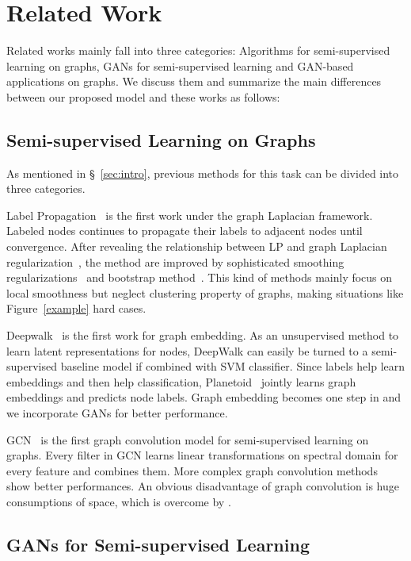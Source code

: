 \section{Related Work}\label{sec:related}
Related works mainly fall into three categories: Algorithms for semi-supervised learning on graphs, GANs for semi-supervised learning and GAN-based applications on graphs. We discuss them and summarize the main differences between our proposed model and these works as follows:
\subsection{Semi-supervised Learning on Graphs}
	As mentioned in \S~\ref{sec:intro}, previous methods for this task can be divided into three categories. 
    
Label Propagation~\cite{zhu2002learning} is the first work under the graph Laplacian framework. Labeled nodes continues to propagate their labels to adjacent nodes until convergence. After revealing the relationship between LP and graph Laplacian regularization~\cite{zhu2003semi}, the method are improved by sophisticated smoothing regularizations~\cite{zhu2003semi,belkin2006manifold} and bootstrap method~\cite{lu2003link}. This kind of methods mainly focus on local smoothness but neglect clustering property of graphs, making situations like Figure~\ref{example} hard cases. 
        
Deepwalk~\cite{Perozzi:14KDD} is the first work for graph embedding. As an unsupervised method to learn latent representations for nodes, DeepWalk can easily be turned to a semi-supervised baseline model if combined with SVM classifier. Since labels help learn embeddings and then help classification, Planetoid~\cite{yang2016revisiting} jointly learns graph embeddings and predicts node labels.
Graph embedding becomes one step in \smodel and we incorporate GANs for better performance.  

GCN~\cite{kipf2016semi} is the first graph convolution model for semi-supervised learning on graphs. Every filter in GCN learns linear transformations on spectral domain for every feature and combines them. More complex graph convolution methods~\cite{defferrard2016convolutional,DBLP:journals/corr/abs-1710-10903} show better performances. An obvious disadvantage of graph convolution is huge consumptions of space, which is overcome by \model. 

\subsection{GANs for Semi-supervised Learning}

